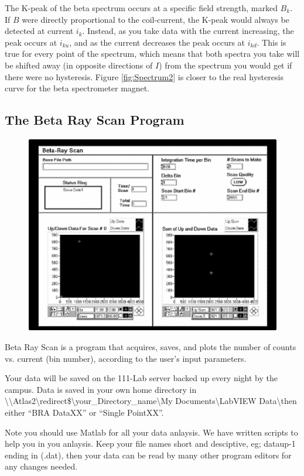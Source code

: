 \documentclass{../lab}
\begin{document}
The K-peak of the beta spectrum occurs at a specific field strength, marked $B_k$. If $B$ were directly proportional to the coil-current, the K-peak would always be detected at current $i_k$. Instead, as you take data with the current increasing, the peak occurs at $i_{ku}$, and as the current decreases the peak occurs at $i_{kd}$. This is true for every point of the spectrum, which means that both spectra you take will be shifted away (in opposite directions of $I$) from the spectrum you would get if there were no hysteresis. Figure \ref{fig:Spectrum2} is closer to the real hysteresis curve for the beta spectrometer magnet.

\subsection{The Beta Ray Scan Program}

\begin{figure}[h]
    \centering
    \href{http://experimentationlab.berkeley.edu/sites/default/files/images/470px-BRAimage030.gif}{\includegraphics[width=0.5\linewidth]{images/470px-BRAimage030.png}}
\end{figure}

Beta Ray Scan is a program that acquires, saves, and plots the number of counts vs. current (bin number), according to the user's input parameters.

Your data will be saved on the 111-Lab server backed up every night by the campus. Data is saved in your own home directory in \textbackslash \textbackslash Atlas2\textbackslash redirect\$\textbackslash your\_Directory\_name\textbackslash My Documents\textbackslash LabVIEW Data\textbackslash then either ``BRA DataXX'' or ``Single PointXX''.

Note you should use Matlab for all your data anlaysis. We have written scripts to help you in you anlaysis. Keep your file names short and desciptive, eg; dataup-1 ending in (.dat), then your data can be read by many other program editors for any changes needed.
\end{document}
